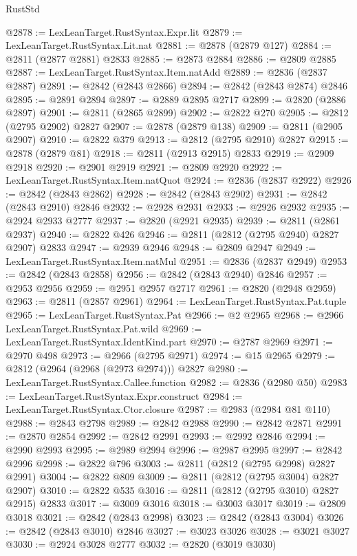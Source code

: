 \begin{lexlean}{RustStd}
\begin{coremodule}
@2878 := LexLeanTarget.RustSyntax.Expr.lit
@2879 := LexLeanTarget.RustSyntax.Lit.nat
@2881 := @2878 (@2879 @127)
@2884 := @2811 (@2877 @2881) @2833
@2885 := @2873 @2884
@2886 := @2809 @2885
@2887 := LexLeanTarget.RustSyntax.Item.natAdd
@2889 := @2836 (@2837 @2887)
@2891 := @2842 (@2843 @2866)
@2894 := @2842 (@2843 @2874) @2846
@2895 := @2891 @2894
@2897 := @2889 @2895 @2717
@2899 := @2820 (@2886 @2897)
@2901 := @2811 (@2865 @2899)
@2902 := @2822 @270
@2905 := @2812 (@2795 @2902) @2827
@2907 := @2878 (@2879 @138)
@2909 := @2811 (@2905 @2907)
@2910 := @2822 @379
@2913 := @2812 (@2795 @2910) @2827
@2915 := @2878 (@2879 @81)
@2918 := @2811 (@2913 @2915) @2833
@2919 := @2909 @2918
@2920 := @2901 @2919
@2921 := @2809 @2920
@2922 := LexLeanTarget.RustSyntax.Item.natQuot
@2924 := @2836 (@2837 @2922)
@2926 := @2842 (@2843 @2862)
@2928 := @2842 (@2843 @2902)
@2931 := @2842 (@2843 @2910) @2846
@2932 := @2928 @2931
@2933 := @2926 @2932
@2935 := @2924 @2933 @2777
@2937 := @2820 (@2921 @2935)
@2939 := @2811 (@2861 @2937)
@2940 := @2822 @426
@2946 := @2811 (@2812 (@2795 @2940) @2827 @2907) @2833
@2947 := @2939 @2946
@2948 := @2809 @2947
@2949 := LexLeanTarget.RustSyntax.Item.natMul
@2951 := @2836 (@2837 @2949)
@2953 := @2842 (@2843 @2858)
@2956 := @2842 (@2843 @2940) @2846
@2957 := @2953 @2956
@2959 := @2951 @2957 @2717
@2961 := @2820 (@2948 @2959)
@2963 := @2811 (@2857 @2961)
@2964 := LexLeanTarget.RustSyntax.Pat.tuple
@2965 := LexLeanTarget.RustSyntax.Pat
@2966 := @2 @2965
@2968 := @2966 LexLeanTarget.RustSyntax.Pat.wild
@2969 := LexLeanTarget.RustSyntax.IdentKind.part
@2970 := @2787 @2969
@2971 := @2970 @498
@2973 := @2966 (@2795 @2971)
@2974 := @15 @2965
@2979 := @2812 (@2964 (@2968 (@2973 @2974))) @2827
@2980 := LexLeanTarget.RustSyntax.Callee.function
@2982 := @2836 (@2980 @50)
@2983 := LexLeanTarget.RustSyntax.Expr.construct
@2984 := LexLeanTarget.RustSyntax.Ctor.closure
@2987 := @2983 (@2984 @81 @110)
@2988 := @2843 @2798
@2989 := @2842 @2988
@2990 := @2842 @2871
@2991 := @2870 @2854
@2992 := @2842 @2991
@2993 := @2992 @2846
@2994 := @2990 @2993
@2995 := @2989 @2994
@2996 := @2987 @2995
@2997 := @2842 @2996
@2998 := @2822 @796
@3003 := @2811 (@2812 (@2795 @2998) @2827 @2991)
@3004 := @2822 @809
@3009 := @2811 (@2812 (@2795 @3004) @2827 @2907)
@3010 := @2822 @535
@3016 := @2811 (@2812 (@2795 @3010) @2827 @2915) @2833
@3017 := @3009 @3016
@3018 := @3003 @3017
@3019 := @2809 @3018
@3021 := @2842 (@2843 @2998)
@3023 := @2842 (@2843 @3004)
@3026 := @2842 (@2843 @3010) @2846
@3027 := @3023 @3026
@3028 := @3021 @3027
@3030 := @2924 @3028 @2777
@3032 := @2820 (@3019 @3030)

\end{coremodule}
\end{lexlean}
